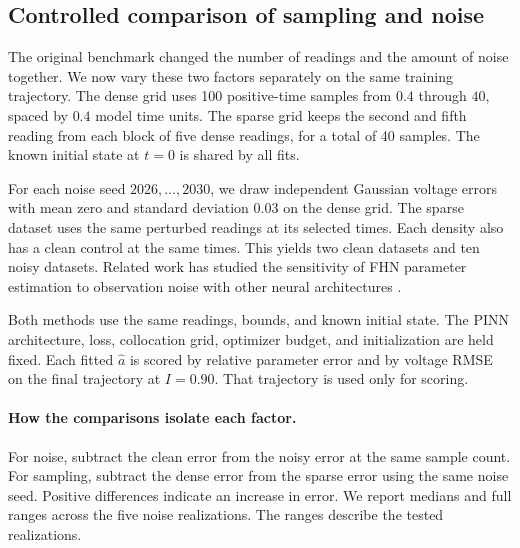 \clearpage

\subsection{Controlled comparison of sampling and noise}
\label{sec:controlled}

The original benchmark changed the number of readings and the amount of noise together. We now vary these two factors separately on the same training trajectory. The dense grid uses 100 positive-time samples from \(0.4\) through \(40\), spaced by \(0.4\) model time units. The sparse grid keeps the second and fifth reading from each block of five dense readings, for a total of 40 samples. The known initial state at \(t=0\) is shared by all fits.

For each noise seed \(2026,\dots,2030\), we draw independent Gaussian voltage errors with mean zero and standard deviation \(0.03\) on the dense grid. The sparse dataset uses the same perturbed readings at its selected times. Each density also has a clean control at the same times. This yields two clean datasets and ten noisy datasets. Related work has studied the sensitivity of FHN parameter estimation to observation noise with other neural architectures \cite{rudi2022}.

Both methods use the same readings, bounds, and known initial state. The PINN architecture, loss, collocation grid, optimizer budget, and initialization are held fixed. Each fitted \(\hat a\) is scored by relative parameter error and by voltage RMSE on the final trajectory at \(I=0.90\). That trajectory is used only for scoring.

\paragraph{How the comparisons isolate each factor.}
For noise, subtract the clean error from the noisy error at the same sample count. For sampling, subtract the dense error from the sparse error using the same noise seed. Positive differences indicate an increase in error. We report medians and full ranges across the five noise realizations. The ranges describe the tested realizations.

\begin{table}[H]
  \centering
  \caption{Controlled experiment results on the final test at \(I=0.90\). Noisy conditions show the median and full range in brackets. The two clean datasets contribute one fit per method.}
  \label{tab:controlled-both}
  \small
  
\end{table}

